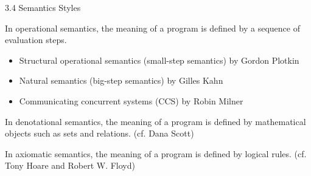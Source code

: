\documentclass[table]{beamer}
\begin{document}
\begin{frame}[t]{3.4 Semantics Styles} 

In operational semantics, the meaning of a program is defined by a sequence of evaluation steps.
\begin{itemize}
\item Structural operational semantics (small-step semantics) by Gordon Plotkin
\item Natural semantics (big-step semantics) by Gilles Kahn
\item Communicating concurrent systems (CCS) by Robin Milner
\end{itemize}

\vspace{10pt}

In denotational semantics, the meaning of a program is defined by mathematical objects such as sets and relations. (cf. Dana Scott)

\vspace{10pt}

In axiomatic semantics, the meaning of a program is defined by logical rules. (cf. Tony Hoare and Robert W. Floyd)

\end{frame}
\end{document}
